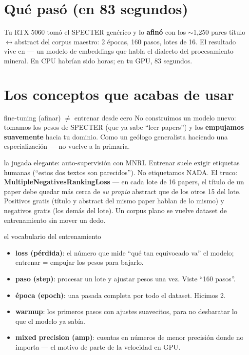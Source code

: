 \documentclass[11pt,a4paper]{article}
\begin{document}

\section{Qué pasó (en 83 segundos)}

Tu RTX 5060 tomó el SPECTER genérico y lo \textbf{afinó} con los $\sim$1,250 pares
título$\leftrightarrow$abstract del corpus maestro: 2 épocas, 160 pasos, lotes de 16.
El resultado vive en  — un modelo de embeddings que habla
el dialecto del procesamiento mineral. En CPU habrían sido horas; en tu GPU, 83 segundos.

\section{Los conceptos que acabas de usar}

\begin{concepto}{fine-tuning (afinar) $\neq$ entrenar desde cero}
No construimos un modelo nuevo: tomamos los pesos de SPECTER (que ya sabe ``leer papers'')
y los \textbf{empujamos suavemente} hacia tu dominio. Como un geólogo generalista haciendo
una especialización — no vuelve a la primaria.
\end{concepto}

\begin{concepto}{la jugada elegante: auto-supervisión con MNRL}
Entrenar suele exigir etiquetas humanas (``estos dos textos son parecidos''). No etiquetamos
NADA. El truco: \textbf{MultipleNegativesRankingLoss} — en cada lote de 16 papers, el título
de un paper debe quedar más cerca de \emph{su propio} abstract que de los otros 15 del lote.
Positivos gratis (título y abstract del mismo paper hablan de lo mismo) y negativos gratis
(los demás del lote). Un corpus plano se vuelve dataset de entrenamiento sin mover un dedo.
\end{concepto}

\begin{concepto}{el vocabulario del entrenamiento}
\begin{itemize}
  \item \textbf{loss (pérdida)}: el número que mide ``qué tan equivocado va'' el modelo;
        entrenar = empujar los pesos para bajarlo.
  \item \textbf{paso (step)}: procesar un lote y ajustar pesos una vez. Viste ``160 pasos''.
  \item \textbf{época (epoch)}: una pasada completa por todo el dataset. Hicimos 2.
  \item \textbf{warmup}: los primeros pasos con ajustes suavecitos, para no desbaratar lo
        que el modelo ya sabía.
  \item \textbf{mixed precision (amp)}: cuentas en números de menor precisión donde no
        importa — el motivo de parte de la velocidad en GPU.
\end{itemize}
\end{concepto}
\end{document}
